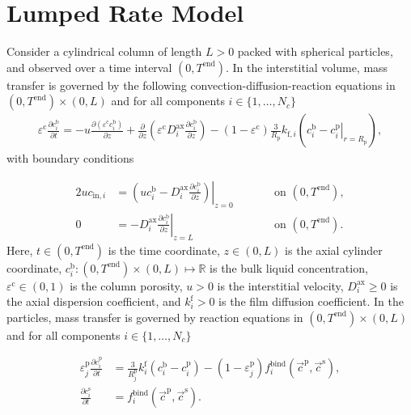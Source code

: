 \documentclass{article}
\begin{document}
\section*{Lumped Rate Model}
Consider a cylindrical column of length $L > 0$ packed with spherical particles, and observed over a time interval $(0, T^{\mathrm{end}})$.
In the interstitial volume, mass transfer is governed by the following convection-diffusion-reaction equations in $(0, T^\mathrm{end})\times (0, L)$ and for all components $i\in\{1, \dots, N_c\}$
\begin{align}
\varepsilon^{\mathrm{c}} \frac{\partial c^{\mathrm{b}}_i}{\partial t} = - u \frac{\partial \left( \varepsilon^{\mathrm{c}} c^{\mathrm{b}}_i \right)}{\partial z} + \frac{\partial}{\partial z} \left( \varepsilon^{\mathrm{c}} D^{\mathrm{ax}}_{i} \frac{\partial c^{\mathrm{b}}_i}{\partial z} \right)- \left(1 - \varepsilon^{\mathrm{c}} \right) \frac{3}{R_{\mathrm{p}}} k_{\mathrm{f},i} \left(c^{\mathrm{b}}_i - \left. c^{\mathrm{p}}_{i} \right|_{r = R_{\mathrm{p}}} \right),
\end{align}
with boundary conditions

\begin{alignat}{2}
u c_{\mathrm{in},i} &= \left.\left( u c^{\mathrm{b}}_i - D^{\mathrm{ax}}_{i} \frac{\partial c^{\mathrm{b}}_i}{\partial z}\right)\right|_{z=0} & &\qquad\text{on }(0, T^{\mathrm{end}}),\\
               0 &= - D^{\mathrm{ax}}_{i} \left. \frac{\partial c^{\mathrm{b}}_i}{\partial z} \right|_{z=L} & &\qquad\text{on }(0, T^{\mathrm{end}}).
\end{alignat}
Here, $t\in (0, T^{\mathrm{end}})$ is the time coordinate, $z\in (0, L)$ is the axial cylinder coordinate, $c^\mathrm{b}_i\colon (0, T^\mathrm{end})\times (0, L) \mapsto \mathbb{R}$ is the bulk liquid concentration, $\varepsilon^{\mathrm{c}}\in (0, 1)$ is the column porosity, $u> 0$ is the interstitial velocity, $D^\mathrm{ax}_i\geq 0$ is the axial dispersion coefficient, and $k^\mathrm{f}_i> 0$ is the film diffusion coefficient.
In the particles, mass transfer is governed by reaction equations in $ (0, T^\mathrm{end}) \times (0, L)$ and for all components $i\in\{1, \dots, N_c\}$

\begin{align}

          \varepsilon^{\mathrm{p}}_{j}\frac{\partial c^{\mathrm{p}}_{i}}{\partial t} 
          &=\frac{3}{R^{\mathrm{p}}_{j}} k^\mathrm{f}_{i} \left( c^{\mathrm{b}}_{i} - c^{\mathrm{p}}_{i} \right) - \left( 1 - \varepsilon^{\mathrm{p}}_{j} \right) f^{\mathrm{bind}}_{i} \left( \vec{c}^{\mathrm{p}}, \vec{c}^{\mathrm{s}} \right) ,\\

          \frac{\partial c^{\mathrm{s}}_{i}}{\partial t}
          &= f^{\mathrm{bind}}_{i}\left( \vec{c}^{\mathrm{p}}, \vec{c}^{\mathrm{s}} \right).
\end{align}
\end{document}
